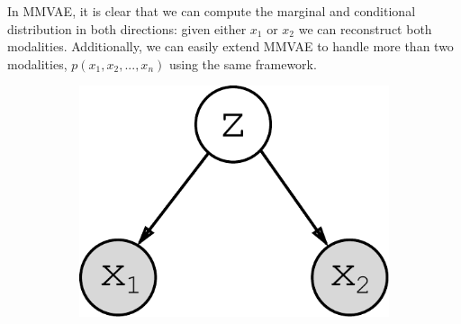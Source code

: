 \documentclass{article}
\begin{document}
In MMVAE, it is clear that we can compute the marginal and conditional distribution in both directions: given either $x_{1}$ or $x_{2}$ we can reconstruct both modalities. Additionally, we can easily extend MMVAE to handle more than two modalities, $p(x_{1}, x_{2}, ..., x_{n})$ using the same framework.

\begin{figure}[h!]
\centering
    \begin{subfigure}[b]{.24\linewidth}
        \centering
        \includegraphics[width=.75\linewidth]{graph.pdf}
        \caption{}
        \label{fig:diagram:graph}
    \end{subfigure}\hspace{5mm}
    \begin{subfigure}[b]{.10\linewidth}

\end{subfigure}
\end{figure}
\end{document}
